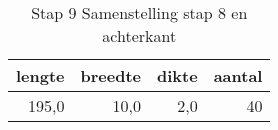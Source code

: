 \begin{table}[h!]
\centering
\caption{Stap 9 Samenstelling stap 8 en achterkant}
\begin{tabular}{rrrr}
\toprule
 lengte &  breedte &  dikte &  aantal \\
\midrule
  195,0 &     10,0 &    2,0 &      40 \\
\bottomrule
\end{tabular}
\end{table}
